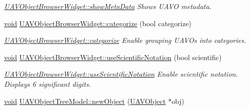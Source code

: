 \begin{DoxyCompactItemize}
\begin{DoxyCompactList}\small\item\em \hyperlink{group___u_a_v_object_browser_plugin_ga96e35f04d563b34d393bcd810423910d}{\-U\-A\-V\-Object\-Browser\-Widget\-::show\-Meta\-Data} \-Shows \-U\-A\-V\-O metadata. \end{DoxyCompactList}\item 
\hyperlink{group___u_a_v_objects_plugin_ga444cf2ff3f0ecbe028adce838d373f5c}{void} \hyperlink{group___u_a_v_object_browser_plugin_gaf58df81be827bdbeed97dcb96dcfbb6a}{\-U\-A\-V\-Object\-Browser\-Widget\-::categorize} (bool categorize)
\begin{DoxyCompactList}\small\item\em \hyperlink{group___u_a_v_object_browser_plugin_gaf58df81be827bdbeed97dcb96dcfbb6a}{\-U\-A\-V\-Object\-Browser\-Widget\-::categorize} \-Enable grouping \-U\-A\-V\-Os into categories. \end{DoxyCompactList}\item 
\hyperlink{group___u_a_v_objects_plugin_ga444cf2ff3f0ecbe028adce838d373f5c}{void} \hyperlink{group___u_a_v_object_browser_plugin_gaf9528641294317e651ef6e23f6e11946}{\-U\-A\-V\-Object\-Browser\-Widget\-::use\-Scientific\-Notation} (bool scientific)
\begin{DoxyCompactList}\small\item\em \hyperlink{group___u_a_v_object_browser_plugin_gaf9528641294317e651ef6e23f6e11946}{\-U\-A\-V\-Object\-Browser\-Widget\-::use\-Scientific\-Notation} \-Enable scientific notation. \-Displays 6 significant digits. \end{DoxyCompactList}\item 
\hyperlink{group___u_a_v_objects_plugin_ga444cf2ff3f0ecbe028adce838d373f5c}{void} \hyperlink{group___u_a_v_object_browser_plugin_gafd9deb057c76e2910dd13055abcbad3e}{\-U\-A\-V\-Object\-Tree\-Model\-::new\-Object} (\hyperlink{class_u_a_v_object}{\-U\-A\-V\-Object} $\ast$obj)
\end{DoxyCompactItemize}
